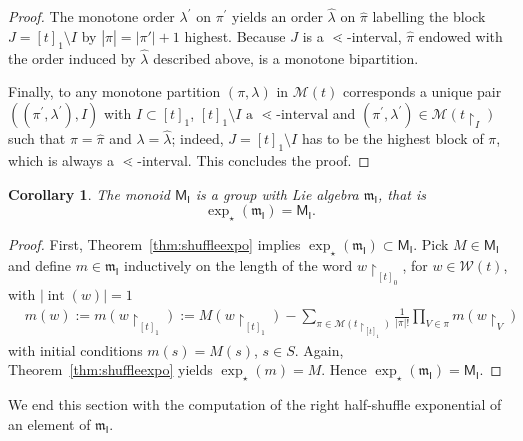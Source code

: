 \documentclass[pdftex]{sigma}
\newcommand\INT[1]{\operatorname{int}(#1)}
\renewcommand{\restriction}[2]{{#1\mathbin{\upharpoonright}_{#2}}}
\newcommand{\stdl}{\lessdot}
\newcommand\IWc{\mathcal{W}}
\def\MBNCc{{\mathcal{M}}}
\newcommand\shgrI{{\mathsf M}_{\mathsf I}}
\newcommand\shalI{{\mathfrak m}_{\mathsf I}}
\numberwithin{equation}{section}
\newtheorem{Corollary}[Theorem]{Corollary}
\begin{document}
\begin{proof}
 The monotone order $\lambda^{\prime}$ on $\pi^{\prime}$ yields an order $\hat{\lambda}$ on $\hat{\pi}$ labelling the block $J=[t]_{1}\setminus I$ by $|\hat\pi|=|\pi'|+1$ highest.
	Because $J$ is a $\stdl$-interval, $\hat{\pi}$ endowed with the order induced by $\hat\lambda$ described above, is a monotone bipartition.

	Finally, to any monotone partition $(\pi, \lambda)$ in $\MBNCc(t)$ corresponds a unique pair $((\pi^{\prime},\lambda^{\prime}),I)$ with $I \subset [t]_1$, $[t]_1 \setminus I \text{ a }\stdl \text{-interval}$ and $(\pi^{\prime},\lambda^{\prime})\in\MBNCc(\restriction{t}{I})$
	such that $\pi=\hat{\pi}$ and $\lambda = \hat{\lambda}$; indeed, $J=[t]_1\setminus I$ has to be the highest block of $\pi$, which is always a $\stdl$-interval. This concludes the proof.
\end{proof}
\begin{Corollary}
	\label{cor:shgrIisagroup}
	The monoid $\shgrI$ is a group with Lie algebra $\shalI$, that is
	\[
	\exp_{\star}(\shalI) = \shgrI.
	\]
\end{Corollary}
\begin{proof}
	First, Theorem~\ref{thm:shuffleexpo} implies $\exp_{\star}(\shalI)\subset \shgrI$.
	Pick $M \in \shgrI$ and define $m \in\shalI$ inductively on the length of the word $\restriction{w}{[t]_0}$, for $w\in \IWc(t)$,
 with $|\INT{w}|=1$
	\begin{align*}
		 & m(w)
		 :=m(\restriction{w}{[t]_1})
		 :=M(\restriction{w}{[t]_1})
		 -\sum_{\pi\in \MBNCc(\restriction{t}{[t]_1})}\frac{1}{|\pi|!}
		 \prod_{V\in \pi}m(\restriction{w}{V})
	\end{align*}
	with initial conditions $m(s) = M(s)$, $s \in S$. Again, Theorem~\ref{thm:shuffleexpo} yields $\exp_{\star}(m)=M$. Hence $\exp_{\star}(\shalI) = \shgrI$.
\end{proof}

We end this section with the computation of the right half-shuffle exponential of an element of $\shalI$.
\end{document}
